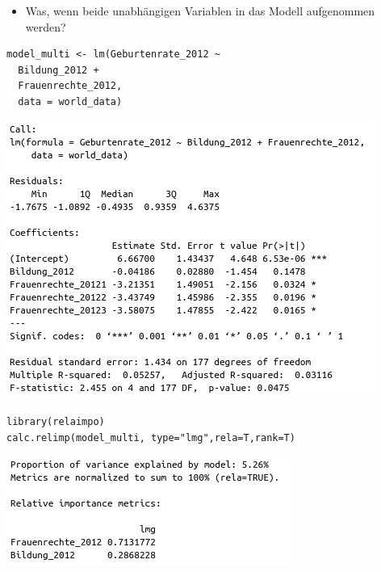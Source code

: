 \documentclass[aspectratio=169, journal, x11names, unknownkeysallowed, hyperref={colorlinks,
linkcolor = SS2,
urlcolor  = F3,
citecolor = F3,
anchorcolor = A4}, 12pt]{beamer}
\begin{document}
  \begin{frame}[t, fragile]
    \begin{minipage}[t]{0.45\textwidth}
        \begin{itemize}
          \item[] Was, wenn beide unabhängigen Variablen in das Modell aufgenommen werden?
        \end{itemize} 
        \begin{lstlisting}
model_multi <- lm(Geburtenrate_2012 ~ 
  Bildung_2012 + 
  Frauenrechte_2012, 
  data = world_data)        
        \end{lstlisting} 
        \centering
        \includegraphics[scale=0.3]{../Plots/sum_multi.png}
      \end{minipage}%
      \begin{minipage}[t]{0.45\textwidth}
        \vspace{-1em}

        \centering
        \begin{lstlisting}
library(relaimpo)
calc.relimp(model_multi, type="lmg",rela=T,rank=T)    
                  \end{lstlisting} 

        \includegraphics[scale=0.5]{../Plots/relimp_multi.png}
      \end{minipage}
  \end{frame}
\end{document}
